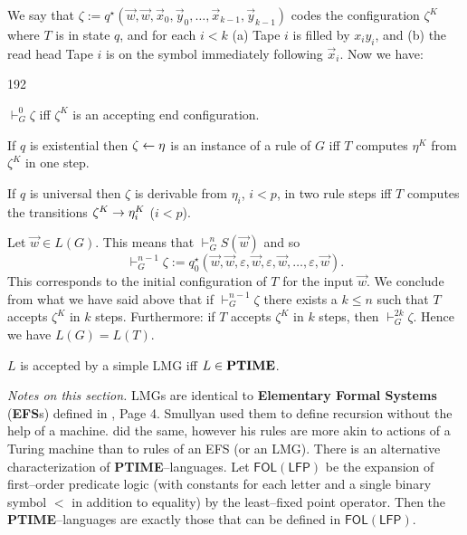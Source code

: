 We say that $\zeta := q^{\star}(\vec{w}, \vec{w}, %
\vec{x}_0, \vec{y}_0, \dotsc, \vec{x}_{k-1}, \vec{y}_{k-1})$
codes the configuration $\zeta^K$ where $T$ is in state $q$, 
and for each $i < k$ (a) Tape $i$ is filled  by $x_iy_i$, 
and (b) the read head Tape $i$ is on the symbol immediately 
following $\vec{x}_i$. Now we have:
\begin{dingautolist}{192}
\item $\vdash_G^0 \zeta$ iff
    $\zeta^K$ is an accepting end configuration.
\item If $q$ is existential then $\zeta \leftarrow \eta$ is an
    instance of a rule of $G$ iff
    $T$ computes $\eta^K$ from $\zeta^K$ in one step.
\item If $q$ is universal then $\zeta$ is derivable from
     $\eta_i$, $i < p$, in two rule steps iff
    $T$ computes the transitions
    $\zeta^K \rightarrow \eta_i^K$ ($i < p$).
\end{dingautolist}
Let $\vec{w} \in L(G)$. This means that
$\vdash_G^n S(\vec{w})$ and so
\begin{equation}
\vdash_G^{n-1} \zeta := q_0^{\star}(\vec{w}, \vec{w}, \varepsilon,
    \vec{w}, \varepsilon, \vec{w}, \dotsc, \varepsilon,
    \vec{w}).
\end{equation}
This corresponds to the initial configuration of
$T$ for the input $\vec{w}$. We conclude from what we have said
above that if $\vdash_G^{n-1} \zeta$ there exists a
$k \leq n$ such that $T$ accepts $\zeta^K$ in $k$ steps.
Furthermore: if $T$ accepts $\zeta^K$ in $k$ steps, then
$\vdash_G^{2k} \zeta$. Hence we have $L(G) = L(T)$.
\begin{thm}[Groenink]
$L$ is accepted by a simple LMG iff
$L \in \mbox{\textbf{PTIME}}$.
\end{thm}
{\it Notes on this section.} 
LMGs are identical to \textbf{Elementary Formal Systems} (\textbf{EFS}s) %
defined in \cite{smullyan:formal}, Page 4. Smullyan used them to 
define recursion without the help of a machine. \cite{post:formal} 
did the same, however his rules are more akin to actions of a Turing 
machine than to rules of an EFS (or an LMG). There is an alternative 
characterization of \textbf{PTIME}--languages. Let 
$\mathsf{FOL}(\mathsf{LFP})$ be 
the expansion of first--order predicate logic (with constants for 
each letter and a single binary symbol $<$ in addition to equality)
by the least--fixed point operator. Then the \textbf{PTIME}--languages 
are exactly those that can be defined in $\mathsf{FOL}(\mathsf{LFP})$. 
